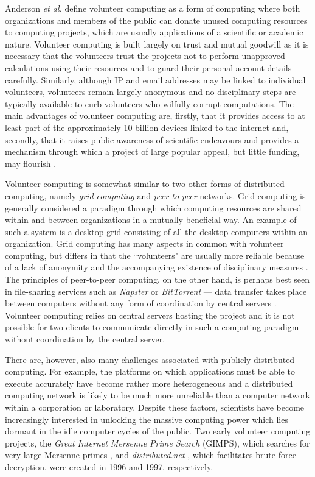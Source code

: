 Anderson \emph{et al.} \cite{boincwiki} define volunteer computing as a form of computing where both organizations and members of the public can donate unused computing resources to computing projects, which are usually applications of a scientific or academic nature. Volunteer computing is built largely on trust and mutual goodwill as it is necessary that the volunteers trust the projects not to perform unapproved calculations using their resources and to guard their personal account details carefully. Similarly, although IP and email addresses may be linked to individual volunteers, volunteers remain largely anonymous and no disciplinary steps are typically available to curb   volunteers who wilfully corrupt computations. The main advantages of volunteer computing are, firstly, that it provides access to at least part of the approximately 10 billion devices linked to the internet \cite{anderson2013,cisco} and, secondly, that it raises public awareness of scientific endeavours and provides a mechanism through which a project of large popular appeal, but little funding, may flourish \cite{boincwiki}.

Volunteer computing is somewhat similar to two other forms of distributed computing, namely \emph{grid computing} and \emph{peer-to-peer} networks. Grid computing is generally considered a paradigm through which computing resources are shared within and between organizations in a mutually beneficial way. An example of such a system is a   desktop grid consisting of  all the desktop computers within an organization. Grid computing has many aspects in common with volunteer computing, but differs in that the ``volunteers" are usually more reliable because of a lack of anonymity and the accompanying existence of disciplinary measures \cite{fostergrid,boincwiki}. The principles of peer-to-peer computing, on the other hand, is  perhaps best seen in file-sharing services such as \textsl{Napster} \cite{napster} or \textsl{BitTorrent}   \cite{bittorrent} --- data transfer takes place between computers without any form of coordination by central servers \cite{peer, peer2}. Volunteer computing relies on central servers hosting the project and it is not possible for two clients to communicate directly in such a computing paradigm without coordination by the central server.  

There are, however, also many challenges associated with publicly distributed computing. For example, the platforms on which   applications must be able to execute accurately have become rather more heterogeneous  and a distributed computing   network is likely to be much more unreliable than  a computer network within a corporation or laboratory.   Despite these factors, scientists have become increasingly interested in unlocking   the massive computing power which   lies dormant in the idle computer cycles of the public. Two early volunteer computing projects, the \emph{Great Internet Mersenne Prime Search} (GIMPS), which searches for very large Mersenne primes \cite{gimps}, and \emph{distributed.net} \cite{distnet}, which facilitates brute-force decryption, were created in 1996 and 1997, respectively. 

